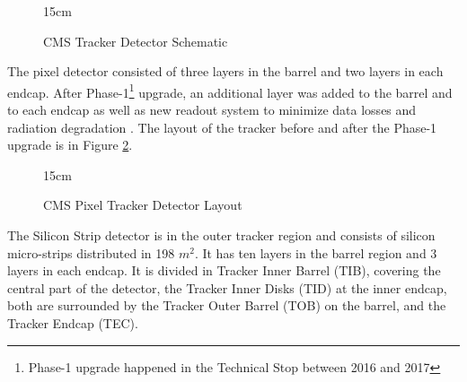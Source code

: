 \begin{figure}[!htm]{15cm} 
\caption{CMS Tracker Detector Schematic}%
\label{fig:tracker_layout}
\end{figure}

The pixel detector consisted of three layers in the barrel and two layers in each endcap. After Phase-1\footnote{Phase-1 upgrade happened in the Technical Stop between 2016 and 2017} upgrade, an additional layer was added to the barrel and to each endcap as well as new readout system to minimize data losses and radiation degradation \cite{Dominguez:1481838}. The layout of the tracker before and after the Phase-1 upgrade is in Figure \ref{fig:pixel_layout}.

\begin{figure}[!htm]{15cm}
\caption{CMS Pixel Tracker Detector Layout}%
\label{fig:pixel_layout}
\end{figure}

The Silicon Strip detector is in the outer tracker region and consists of silicon micro-strips distributed in 198 $m^2$. It has ten layers in the barrel region and 3 layers in each endcap. It is divided in Tracker Inner Barrel (TIB), covering the central part of the detector, the Tracker Inner Disks (TID) at the inner endcap, both are surrounded by the Tracker Outer Barrel (TOB) on the barrel, and the Tracker Endcap (TEC).

